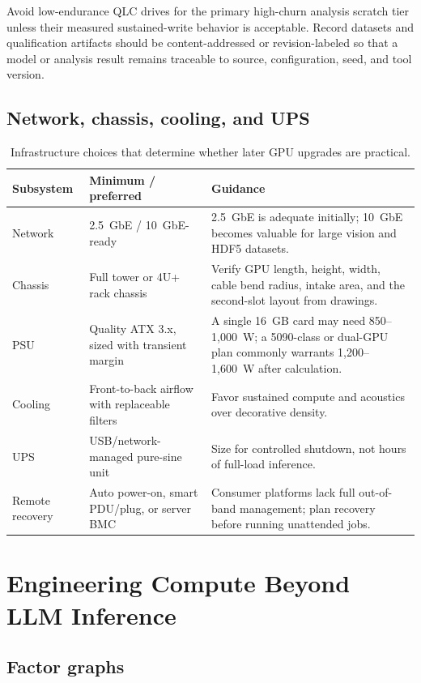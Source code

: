 \documentclass[11pt]{article}
\begin{document}
Avoid low-endurance QLC drives for the primary high-churn analysis scratch tier
unless their measured sustained-write behavior is acceptable. Record datasets
and qualification artifacts should be content-addressed or revision-labeled so
that a model or analysis result remains traceable to source, configuration,
seed, and tool version.

\subsection{Network, chassis, cooling, and UPS}

\begin{table}[htbp]
\centering
\small
\begin{tabularx}{\textwidth}{L{0.16\textwidth} L{0.23\textwidth} Y}
\toprule
Subsystem & Minimum / preferred & Guidance \\
\midrule
Network & 2.5~GbE / 10~GbE-ready & 2.5~GbE is adequate initially; 10~GbE becomes valuable for large vision and HDF5 datasets. \\
Chassis & Full tower or 4U+ rack chassis & Verify GPU length, height, width, cable bend radius, intake area, and the second-slot layout from drawings. \\
PSU & Quality ATX 3.x, sized with transient margin & A single 16~GB card may need 850--1,000~W; a 5090-class or dual-GPU plan commonly warrants 1,200--1,600~W after calculation. \\
Cooling & Front-to-back airflow with replaceable filters & Favor sustained compute and acoustics over decorative density. \\
UPS & USB/network-managed pure-sine unit & Size for controlled shutdown, not hours of full-load inference. \\
Remote recovery & Auto power-on, smart PDU/plug, or server BMC & Consumer platforms lack full out-of-band management; plan recovery before running unattended jobs. \\
\bottomrule
\end{tabularx}
\caption{Infrastructure choices that determine whether later GPU upgrades are practical.}
\end{table}

\section{Engineering Compute Beyond LLM Inference}

\subsection{Factor graphs}
\end{document}

